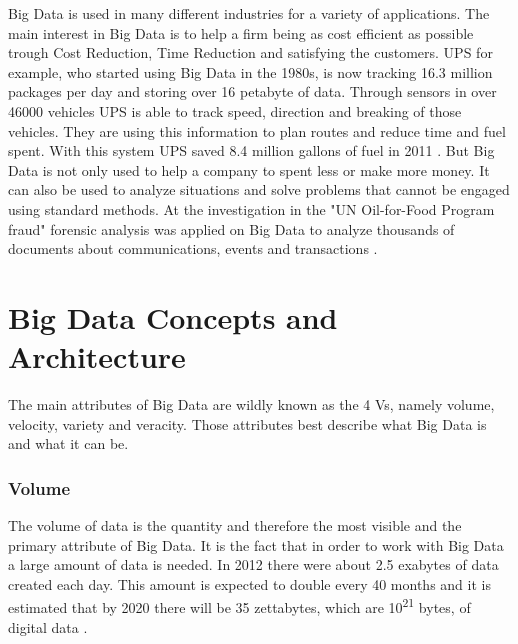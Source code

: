 \documentclass[runningheads]{llncs}
\begin{document}
Big Data is used in many different industries for a variety of applications. The main interest in Big Data is to help a firm being as cost efficient as possible trough Cost Reduction, Time Reduction and satisfying the customers. UPS for example, who started using Big Data in the 1980s, is now tracking 16.3 million packages per day and storing over 16 petabyte of data. Through sensors in over 46000 vehicles UPS is able to track speed, direction and breaking of those vehicles. They are using this information to plan routes and reduce time and fuel spent. With this system UPS saved 8.4 million gallons of fuel in 2011 \cite{DAVENPORT}. But Big Data is not only used to help a company to spent less or make more money. It can also be used to analyze situations and solve problems that cannot be engaged using standard methods. At the investigation in the "UN Oil-for-Food Program fraud" forensic analysis was applied on Big Data to analyze thousands of documents about communications, events and transactions \cite{Hans}.

\section{Big Data Concepts and Architecture}
The main attributes of Big Data are wildly known as the 4 Vs, namely volume, velocity, variety and veracity. Those attributes best describe what Big Data is and what it can be.

\subsubsection{Volume}
The volume of data is the quantity and therefore the most visible and the primary attribute of Big Data. It is the fact that in order to work with Big Data a large amount of data is needed. In 2012 there were about 2.5 exabytes of data created each day. This amount is expected to double every 40 months \cite{MCAFEE} and it is estimated that by 2020 there will be 35 zettabytes, which are 10\textsuperscript{21} bytes, of digital data \cite{FELDMAN}.
\end{document}
